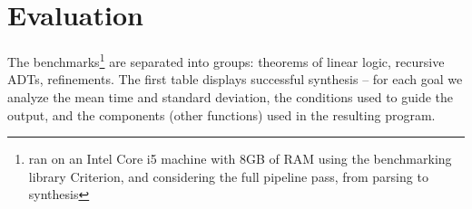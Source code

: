 \documentclass{llncs}
\begin{document}



\section{Evaluation}\label{sec:evaluation}

The benchmarks\footnote{ran on an Intel Core i5 machine with 8GB of RAM using the benchmarking library
Criterion, and considering the full pipeline pass, from parsing to synthesis} are separated into groups: theorems of linear logic, recursive
ADTs, refinements. The first table displays successful synthesis -- for each
goal we analyze the mean time and standard deviation, the conditions used to
guide the output, and the components (other functions) used in the resulting
program.
\end{document}
